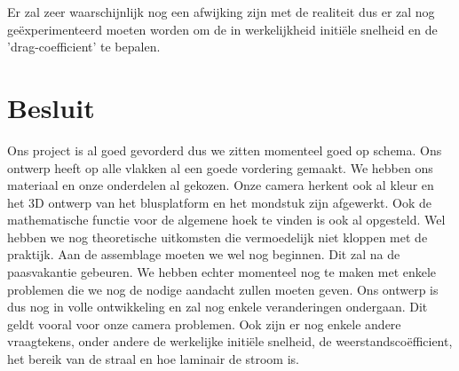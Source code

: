 \documentclass{kulakarticle}
\begin{document}
Er zal zeer waarschijnlijk nog een afwijking zijn met de realiteit dus er zal nog geëxperimenteerd moeten worden om de in werkelijkheid initiële snelheid en de 'drag-coefficient' te bepalen.

\section*{Besluit}

Ons project is al goed gevorderd dus we zitten momenteel goed op schema. Ons ontwerp heeft op alle vlakken al een goede vordering gemaakt. We hebben ons materiaal en onze onderdelen al gekozen. Onze camera herkent ook al kleur en het 3D ontwerp van het blusplatform en het mondstuk zijn afgewerkt. Ook de mathematische functie voor de algemene hoek te vinden is ook al opgesteld. Wel hebben we nog theoretische uitkomsten die vermoedelijk niet kloppen met de praktijk.
Aan de assemblage moeten we wel nog beginnen. Dit zal na de paasvakantie gebeuren.
We hebben echter momenteel nog te maken met enkele problemen die we nog de nodige aandacht zullen moeten geven. Ons ontwerp is dus nog in volle ontwikkeling en zal nog enkele veranderingen ondergaan. Dit geldt vooral voor onze camera problemen. Ook zijn er nog enkele andere vraagtekens, onder andere de werkelijke initiële snelheid, de weerstandscoëfficient, het bereik van de straal en hoe laminair de stroom is. 

\newline

\clearpage
\nocite{*}







\end{document}
